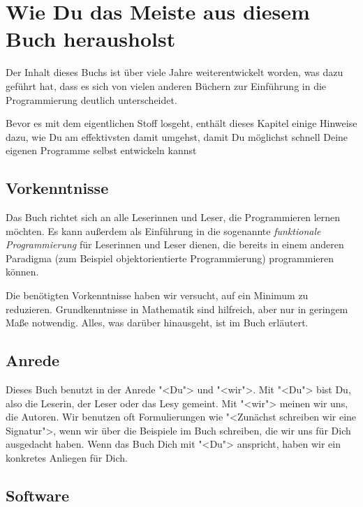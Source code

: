 
\setcounter{chapter}{-1}
\chapter{Wie Du das Meiste aus diesem Buch herausholst}

Der Inhalt dieses Buchs ist über viele Jahre weiterentwickelt worden,
was dazu geführt hat, dass es sich von vielen anderen Büchern zur
Einführung in die Programmierung deutlich unterscheidet.

Bevor es mit dem eigentlichen Stoff losgeht, enthält dieses Kapitel
einige Hinweise dazu, wie Du am effektivsten damit umgehst, damit Du
möglichst schnell Deine eigenen Programme selbst entwickeln kannst

\section{Vorkenntnisse}

Das Buch richtet sich an alle Leserinnen und Leser, die Programmieren
lernen möchten.  Es kann außerdem als Einführung in die sogenannte
\textit{funktionale Programmierung} für Leserinnen und Leser dienen,
die bereits in einem anderen Paradigma (zum Beispiel objektorientierte
Programmierung) programmieren können.

Die benötigten Vorkenntnisse haben wir versucht, auf ein Minimum zu
reduzieren.  Grundkenntnisse in Mathematik sind hilfreich, aber nur in
geringem Maße notwendig.  Alles, was darüber hinausgeht, ist im Buch
erläutert. 

\section{Anrede}

Dieses Buch benutzt in der Anrede "<Du"> und "<wir">.  Mit "<Du"> bist
Du, also die Leserin, der Leser oder das Lesy gemeint.  Mit "<wir"> meinen wir
uns, die Autoren.  Wir benutzen oft Formulierungen wie "<Zunächst
schreiben wir eine Signatur">, wenn wir über die Beispiele im Buch
schreiben, die wir uns für Dich ausgedacht haben.  Wenn das Buch Dich
mit "<Du"> anspricht, haben wir ein konkretes Anliegen für Dich.

\section{Software}

